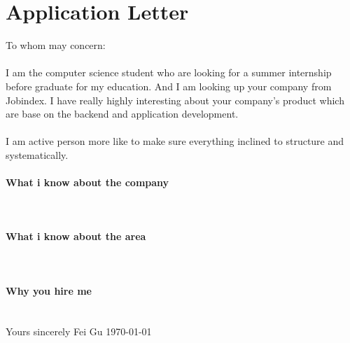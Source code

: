 \section{Application Letter}
To whom may concern:
\newline
\paragraph{}
I am the computer science student who are looking for a summer internship before graduate for my education.
And I am looking up your company from Jobindex.
I have really highly interesting about your company's product which are base on the backend and application development.

\paragraph{}
I am active person more like to make sure everything inclined to structure and systematically.

\paragraph{What i know about the company}\\
\paragraph{What i know about the area}\\
\paragraph{Why you hire me}\\

Yours sincerely
Fei Gu
    \today